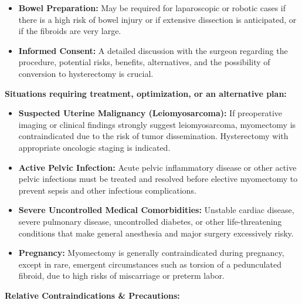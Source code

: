 \begin{itemize}
  \item \textbf{Bowel Preparation:} May be required for laparoscopic or robotic cases if there is a high risk of bowel injury or if extensive dissection is anticipated, or if the fibroids are very large.
  
  \item \textbf{Informed Consent:} A detailed discussion with the surgeon regarding the procedure, potential risks, benefits, alternatives, and the possibility of conversion to hysterectomy is crucial.
\end{itemize}

\textbf{Situations requiring treatment, optimization, or an alternative plan:}

\begin{itemize}
  \item \textbf{Suspected Uterine Malignancy (Leiomyosarcoma):} If preoperative imaging or clinical findings strongly suggest leiomyosarcoma, myomectomy is contraindicated due to the risk of tumor dissemination. Hysterectomy with appropriate oncologic staging is indicated.
  
  \item \textbf{Active Pelvic Infection:} Acute pelvic inflammatory disease or other active pelvic infections must be treated and resolved before elective myomectomy to prevent sepsis and other infectious complications.
  
  \item \textbf{Severe Uncontrolled Medical Comorbidities:} Unstable cardiac disease, severe pulmonary disease, uncontrolled diabetes, or other life-threatening conditions that make general anesthesia and major surgery excessively risky.
  
  \item \textbf{Pregnancy:} Myomectomy is generally contraindicated during pregnancy, except in rare, emergent circumstances such as torsion of a pedunculated fibroid, due to high risks of miscarriage or preterm labor.
\end{itemize}

\textbf{Relative Contraindications \& Precautions:}

